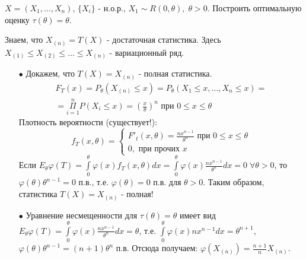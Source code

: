 \begin{example}
	$X = (X_1, \dots, X_n)$, $\{X_i\}$ - н.о.р., $X_1 \sim R(0, \theta), \; \theta > 0$. Построить оптимальную оценку $\tau(\theta) = \theta$.
\end{example}
\begin{solution}
	Знаем, что $X_{(n)} = T(X)$ - достаточная статистика. Здесь $X_{(1)} \le X_{(2)} \le \dots \le X_{(n)}$ - вариационный ряд. 
	\begin{itemize}
		\item[$\bullet$]
			Докажем, что $T(X) = X_{(n)}$ - полная статистика.
			$$\begin{gathered}
				F_T (x) = P_{\theta} (X_{(n)} \le x) = P_{\theta} (X_1 \le x, \dots, X_n \le x) = \\
				= \underset{i=1}{\overset{n}{\Pi}}P(X_i \le x) = \left( \frac{x}{\theta} \right)^n \text{ при } 0 \le x \le \theta
			\end{gathered}$$
			Плотность вероятности (существует!):
			$$f_T (x, \theta) = \begin{cases}
				F'_t (x, \theta) = \frac{n x^{n-1}}{\theta^n} \text{ при } 0 \le x \le \theta \\
				0, \text{ при прочих } x
			\end{cases}$$
			Если $\displaystyle E_{\theta} \varphi(T) = \underset{0}{\overset{\theta}{\int}}\varphi(x) f_T(x, \theta) dx = \underset{0}{\overset{\theta}{\int}}\varphi(x) \frac{n x^{n-1}}{\theta^n}dx = 0 \; \forall \theta > 0$, то $\displaystyle \varphi(\theta) \theta^{n-1} = 0$ п.в., т.е. $\displaystyle \varphi(\theta) = 0$ п.в. для $\theta > 0$. Таким образом, статистика $T(X) = X_{(n)}$ - полная!
		\item[$\bullet$]
			Уравнение несмещенности для $\tau(\theta) = \theta$ имеет вид $\displaystyle E_{\theta} \varphi(T) = \underset{0}{\overset{\theta}{\int}}\varphi(x) \frac{n x^{n-1}}{\theta^n}dx = \theta$, т.е. $\displaystyle \underset{0}{\overset{\theta}{\int}}\varphi(x) n x^{n-1} dx = \theta^{n+1}$, $\displaystyle \varphi(\theta) \theta^{n-1} = (n+1) \theta^n$ п.в. Отсюда получаем: $\displaystyle \varphi(X_{(n)}) = \frac{n+1}{n}X_{(n)}$.
	\end{itemize}
\end{solution}



















